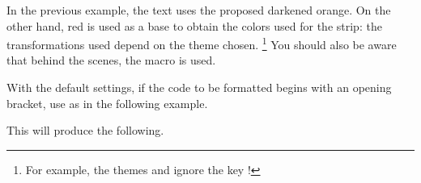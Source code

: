 \documentclass[10pt, a4paper]{tutodoc}
\begin{document}
\begin{tdocnote}
	In the previous example, the text uses the proposed darkened orange. On the other hand, red is used as a base to obtain the colors used for the strip: the transformations used depend on the theme chosen.%
	\footnote{
		For example, the themes  and  ignore the key !
	}
	You should also be aware that behind the scenes, the macro  is used.

	\begin{tdoclatex}[std]
	\end{tdoclatex}
\end{tdocnote}




\begin{tdocwarn}
    With the default settings, if the code to be formatted begins with an opening bracket, use  as in the following example.


    This will produce the following.
\end{tdocwarn}



\end{document}
